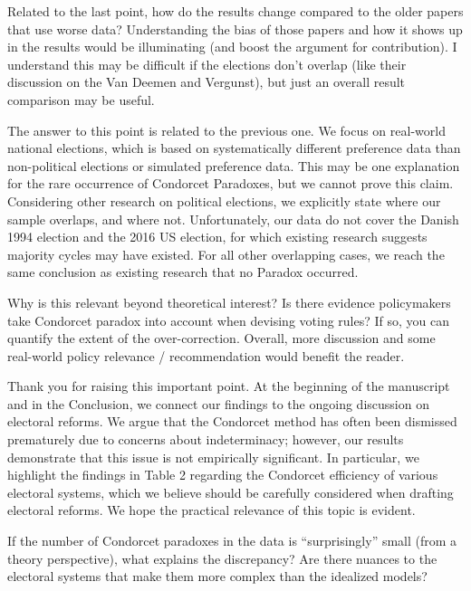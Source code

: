 \documentclass[a4paper, 12pt]{scrartcl}
\theoremstyle{break}
\newenvironment{changes}{\par\color{violet}\par\addvspace{\baselineskip}}{\par\addvspace{\baselineskip}}
\begin{document}
\begin{changes}
	Related to the last point, how do the results change compared to the older papers that use worse data? Understanding the bias of those papers and how it shows up in the results would be illuminating (and boost the argument for contribution). I understand this may be difficult if the elections don’t overlap (like their discussion on the Van	Deemen and Vergunst), but just an overall result comparison may be useful.
\end{changes}
The answer to this point is related to the previous one. We focus on real-world national elections, which is based on systematically different preference data than non-political elections or simulated preference data. This may be one explanation for the rare occurrence of Condorcet Paradoxes, but we cannot prove this claim. Considering other research on political elections, we explicitly state where our sample overlaps, and where not. Unfortunately, our data do not cover the Danish 1994 election and the 2016 US election, for which existing research suggests majority cycles may have existed. For all other overlapping cases, we reach the same conclusion as existing research that no Paradox occurred.



\begin{changes}
	Why is this relevant beyond theoretical interest? Is there evidence policymakers take Condorcet paradox into account when devising voting rules? If so, you can quantify the extent of the over-correction. Overall, more discussion and some real-world policy relevance / recommendation would benefit the reader.
\end{changes}

Thank you for raising this important point. At the beginning of the manuscript and in the Conclusion, we connect our findings to the ongoing discussion on electoral reforms. We argue that the Condorcet method has often been dismissed prematurely due to concerns about indeterminacy; however, our results demonstrate that this issue is not empirically significant. In particular, we highlight the findings in Table 2 regarding the Condorcet efficiency of various electoral systems, which we believe should be carefully considered when drafting electoral reforms. We hope the practical relevance of this topic is evident.

\begin{changes}
	If the number of Condorcet paradoxes in the data is ``surprisingly'' small (from a theory perspective), what explains the discrepancy? Are there nuances to the electoral systems that make them more complex than the idealized models?
\end{changes}
\end{document}
